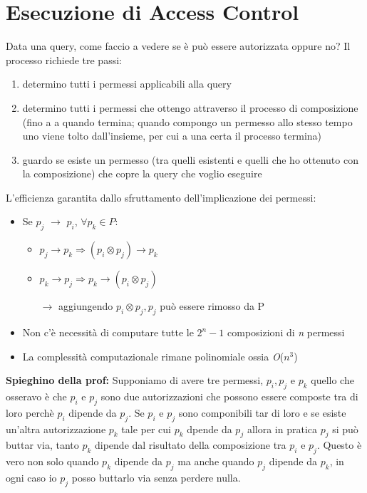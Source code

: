 \documentclass{report}
\begin{document}
\section{Esecuzione di Access Control}
Data una query, come faccio a vedere se è può essere autorizzata oppure no? Il processo richiede tre passi:
\begin{enumerate}
    \item determino tutti i permessi applicabili alla query 
    \item determino tutti i permessi che ottengo attraverso il processo di composizione (fino a a quando termina; quando compongo un permesso allo 
    stesso tempo uno viene tolto dall'insieme, per cui a una certa il processo termina)
    \item guardo se esiste un permesso (tra quelli esistenti e quelli che ho ottenuto con la composizione) che copre la query che voglio eseguire 
\end{enumerate}

\noindent L'efficienza garantita dallo sfruttamento dell'implicazione dei permessi:
\begin{itemize}
    \item Se \textit{$p_j$} $\rightarrow$ \textit{$p_i$}, $\forall p_k \in P$:
    \begin{itemize}
        \item  $ p_j \rightarrow p_k \Rightarrow ( p_i \otimes p_j) \rightarrow p_k$
        \item  $ p_k \rightarrow p_j \Rightarrow p_k \rightarrow (p_i \otimes p_j)$
        
        
        $\rightarrow$  aggiungendo $ p_i \otimes p_j, p_j$ può essere rimosso da P
    \end{itemize}
    \item Non c'è necessità di computare tutte le $2^n - 1$ composizioni di \textit{n} permessi
    \item La complessità computazionale rimane polinomiale ossia \textit{O}($n^3$)
\end{itemize}

\noindent \textbf{Spieghino della prof:} Supponiamo di avere tre permessi, $p_i ,p_j$ e $p_k$ quello che osseravo è che $p_i$ e $p_j$
sono due autorizzazioni che possono essere composte tra di loro perchè $p_i$ dipende da $p_j$. Se $p_i$ e $p_j$ sono componibili tar di loro
e se esiste un'altra autorizzazione $p_k$ tale per cui $p_k$ dpende da $p_j$ allora in pratica $p_j$ si può buttar via, tanto $p_k$ dipende dal
risultato della composizione tra $p_i$ e $p_j$.
Questo è vero non solo quando $p_k$ dipende da $p_j$ ma anche quando $p_j$ dipende da $p_k$, in ogni caso io $p_j$ posso buttarlo via senza perdere nulla.
\end{document}

